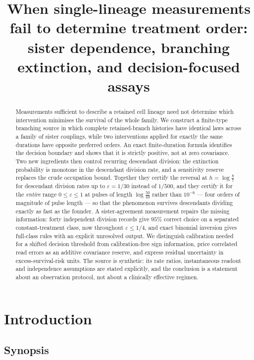 \documentclass[11pt]{article}
\title{When single-lineage measurements fail to determine treatment order:\\
sister dependence, branching extinction, and decision-focused assays}
\author{}
\date{}
\theoremstyle{plain}
\theoremstyle{definition}
\theoremstyle{remark}
\newcommand{\eps}{\varepsilon}
\begin{document}
\maketitle

\begin{abstract}
Measurements sufficient to describe a retained cell lineage need not determine
which intervention minimises the survival of the whole family. We construct a
finite-type branching source in which complete retained-branch histories have
identical laws across a family of sister couplings, while two interventions
applied for exactly the same durations have opposite preferred orders. An exact
finite-duration formula identifies the decision boundary and shows that it is
strictly positive, not at zero covariance. Two new ingredients then control
recurring descendant division: the extinction probability is monotone in the
descendant division rate, and a sensitivity reserve replaces the crude
occupation bound. Together they certify the reversal at $h=\log\frac87$ for
descendant division rates up to $\eps=1/30$ instead of $1/500$, and they
certify it for the \emph{entire} range $0\le\eps\le1$ at pulses of length
$\log\frac{50}{49}$ rather than $10^{-6}$ --- four orders of magnitude of
pulse length --- so that the phenomenon survives descendants dividing exactly
as fast as the founder. A sister-agreement measurement repairs the missing
information: forty independent division records give $95\%$ correct choice on a
separated constant-treatment class, now throughout $\eps\le1/4$, and exact
binomial inversion gives full-class rules with an explicit unresolved output.
We distinguish calibration needed for a shifted decision threshold from
calibration-free sign information, price correlated read errors as an additive
covariance reserve, and express residual uncertainty in excess-survival-risk
units. The source is synthetic: its rate ratios, instantaneous readout and
independence assumptions are stated explicitly, and the conclusion is a
statement about an observation protocol, not about a clinically effective
regimen.
\end{abstract}

\tableofcontents

\section{Introduction}

\subsection{Synopsis}
\end{document}
